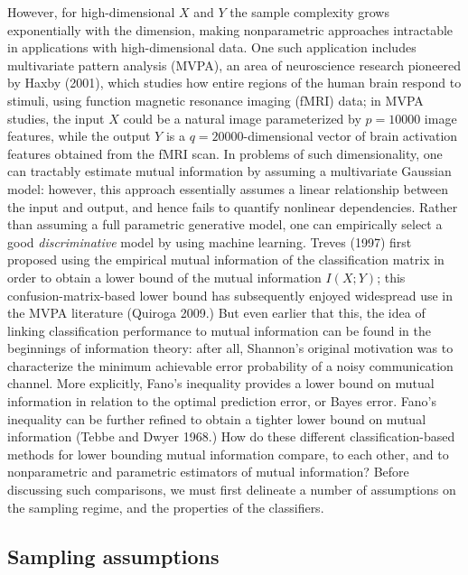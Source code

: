 \documentclass{article}
\begin{document}
However, for high-dimensional $X$ and $Y$ the sample complexity grows exponentially with the dimension,
making nonparametric approaches intractable in applications with high-dimensional data.
One such application includes multivariate pattern analysis (MVPA), an area of neuroscience research pioneered by Haxby (2001), which studies how entire regions of the human brain respond to stimuli, using function magnetic resonance imaging (fMRI) data;
in MVPA studies, the input $X$ could be a natural image parameterized by $p = 10000$ image features,
while the output $Y$ is a $q=20000$-dimensional vector of brain activation features obtained from the fMRI scan.  In problems of such dimensionality, one can tractably
estimate mutual information by assuming a multivariate Gaussian model:
however, this approach essentially assumes a linear relationship
between the input and output, and hence fails to quantify nonlinear
dependencies.  Rather than assuming a full parametric generative model,
one can empirically select a good \emph{discriminative} model by using machine learning.
Treves (1997) first proposed using the empirical mutual information of the classification matrix in order to obtain a lower bound of the mutual information $I(X; Y)$; this confusion-matrix-based lower bound has subsequently enjoyed widespread use in the MVPA literature (Quiroga 2009.)  But even earlier that this, the idea of linking classification performance to mutual information can be found in the beginnings of information theory: after all, Shannon's original
motivation was to characterize the minimum achievable error
probability of a noisy communication channel.  More explicitly, Fano's
inequality provides a lower bound on mutual information in relation to
the optimal prediction error, or Bayes error.  Fano's inequality can
be further refined to obtain a tighter lower bound on mutual
information (Tebbe and Dwyer 1968.)  How do these different classification-based methods for lower bounding mutual information compare, to each other, and to nonparametric and parametric estimators of mutual information?  Before discussing such comparisons, we must first delineate a number of assumptions on the sampling regime, and the properties of the classifiers.

\subsection{Sampling assumptions}
\end{document}
